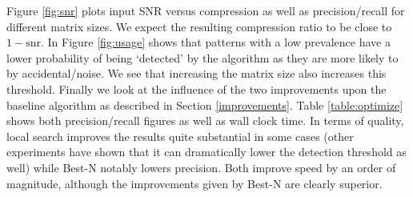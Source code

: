 \documentclass{llncs}
\begin{document}
Figure \ref{fig:snr} plots input SNR versus compression as well as precision/recall for different matrix sizes. We expect the resulting compression ratio to be close to $1-\mathrm{snr}$. In Figure \ref{fig:usage} shows that patterns with a low prevalence have a lower probability of being `detected' by the algorithm as they are more likely to by accidental/noise. We see that increasing the matrix size also increases this threshold. Finally we look at the influence of the two improvements upon the baseline algorithm as described in Section \ref{improvements}. Table \ref{table:optimize} shows both precision/recall figures as well as wall clock time. In terms of quality, local search improves the results quite substantial in some cases (other experiments have shown that it can dramatically lower the detection threshold as well) while Best-N notably lowers precision. Both improve speed by an order of magnitude, although the improvements given by Best-N are clearly superior. %
\end{document}
